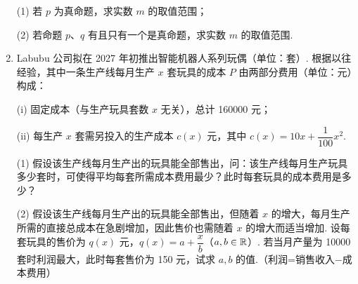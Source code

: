 \begin{enumerate}
(1) 若 $p$ 为真命题，求实数 $m$ 的取值范围；

(2) 若命题 $p$、$q$ 有且只有一个是真命题，求实数 $m$ 的取值范围.

\ifanswer
\solbegin
{}
\step{综上，$0\leqslant m<2$，即 $m$ 的取值范围是 $[0,2)$；}
\solend
\fi

\item Labubu 公司拟在 2027 年初推出智能机器人系列玩偶（单位：套）. 根据以往经验，其中一条生产线每月生产 $x$ 套玩具的成本 $P$ 由两部分费用（单位：元）构成：

(i) 固定成本（与生产玩具套数 $x$ 无关），总计 160000 元；

(ii) 每生产 $x$ 套需另投入的生产成本 $c(x)$ 元，其中 $c(x)=10x+\dfrac1{100}x^2$.

(1) 假设该生产线每月生产出的玩具能全部售出，问：该生产线每月生产玩具多少套时，可使得平均每套所需成本费用最少？此时每套玩具的成本费用是多少？

(2) 假设该生产线每月生产出的玩具能全部售出，但随着 $x$ 的增大，每月生产所需的直接总成本在急剧增加，因此售价也需随着 $x$ 的增大而适当增加. 设每套玩具的售价为 $q(x)$ 元，$q(x)=a+\dfrac xb$（$a,b\in\mathbb{R}$）. 若当月产量为 10000 套时利润最大，此时每套售价为 150 元，试求 $a,b$ 的值.（利润=销售收入$-$成本费用）


\end{enumerate}
